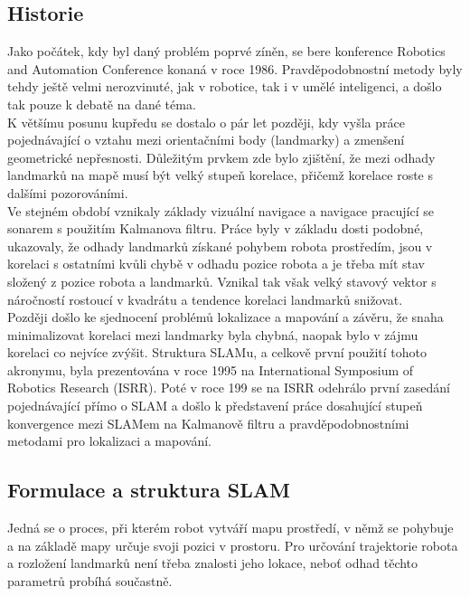 \documentclass[11pt]{article}
\begin{document}
\subsection{Historie}
Jako počátek, kdy byl daný problém poprvé zíněn, se bere konference Robotics and Automation Conference konaná v roce 1986. Pravděpodobnostní metody byly tehdy ještě velmi nerozvinuté, jak v robotice, tak i v umělé inteligenci, a došlo tak pouze k debatě na dané téma.\\
\indent K většímu posunu kupředu se dostalo o pár let později, kdy vyšla práce pojednávající o vztahu mezi orientačními body (landmarky) a zmenšení geometrické nepřesnosti. Důležitým prvkem zde bylo zjištění, že mezi odhady landmarků na mapě musí být velký stupeň korelace, přičemž korelace roste s dalšími pozorováními.\\
\indent Ve stejném období vznikaly základy vizuální navigace a navigace pracující se sonarem s použitím Kalmanova filtru. Práce byly v základu dosti podobné, ukazovaly, že odhady landmarků získané pohybem robota prostředím, jsou v korelaci s ostatními kvůli chybě v odhadu pozice robota a je třeba mít stav složený z pozice robota a landmarků. Vznikal tak však velký stavový vektor s náročností rostoucí v kvadrátu a tendence korelaci landmarků snižovat.\\
\indent Později došlo ke sjednocení problémů lokalizace a mapování a závěru, že snaha minimalizovat korelaci mezi landmarky byla chybná, naopak bylo v zájmu korelaci co nejvíce zvýšit. Struktura SLAMu, a celkově první použití tohoto akronymu, byla prezentována v roce 1995 na International Symposium of Robotics Research (ISRR). Poté v roce 199 se na ISRR odehrálo první zasedání pojednávající přímo o SLAM a došlo k představení práce dosahující stupeň konvergence mezi SLAMem na Kalmanově filtru a pravděpodobnostními metodami pro lokalizaci a mapování.


\subsection{Formulace a struktura SLAM} 
Jedná se o proces, při kterém robot vytváří mapu prostředí, v němž se pohybuje a na základě mapy určuje svoji pozici v prostoru. Pro určování trajektorie robota a rozložení landmarků není třeba znalosti jeho lokace, neboť odhad těchto parametrů probíhá součastně. 
\end{document}
